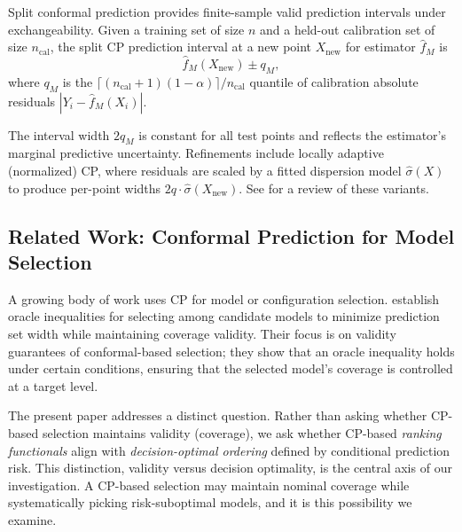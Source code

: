 \documentclass[pdflatex,sn-mathphys-ay]{sn-jnl}%
\theoremstyle{thmstyleone}%
\theoremstyle{thmstyletwo}%
\theoremstyle{thmstylethree}%
\begin{document}
Split conformal prediction \citep{lei2018, angelopoulos2023} provides finite-sample valid prediction intervals under exchangeability. Given a training set of size $n$ and a held-out calibration set of size $n_{\text{cal}}$, the split CP prediction interval at a new point $X_{\text{new}}$ for estimator $\hat{f}_M$ is
\begin{equation}
    \hat{f}_M(X_{\text{new}}) \pm q_M,
    \label{eq:split-cp}
\end{equation}
where $q_M$ is the $\lceil (n_{\text{cal}}+1)(1-\alpha)\rceil / n_{\text{cal}}$ quantile of calibration absolute residuals $|Y_i - \hat{f}_M(X_i)|$.

The interval width $2q_M$ is constant for all test points and reflects the estimator's marginal predictive uncertainty. Refinements include locally adaptive (normalized) CP, where residuals are scaled by a fitted dispersion model $\hat{\sigma}(X)$ to produce per-point widths $2q \cdot \hat{\sigma}(X_{\text{new}})$. See \citet{lei2018, angelopoulos2023} for a review of these variants.

\subsection{Related Work: Conformal Prediction for Model Selection}

A growing body of work uses CP for model or configuration selection. \citet{yang2024conformal} establish oracle inequalities for selecting among candidate models to minimize prediction set width while maintaining coverage validity. Their focus is on validity guarantees of conformal-based selection; they show that an oracle inequality holds under certain conditions, ensuring that the selected model's coverage is controlled at a target level.

The present paper addresses a distinct question. Rather than asking whether CP-based selection maintains validity (coverage), we ask whether CP-based \textit{ranking functionals} align with \textit{decision-optimal ordering} defined by conditional prediction risk. This distinction, validity versus decision optimality, is the central axis of our investigation. A CP-based selection may maintain nominal coverage while systematically picking risk-suboptimal models, and it is this possibility we examine.
\end{document}
